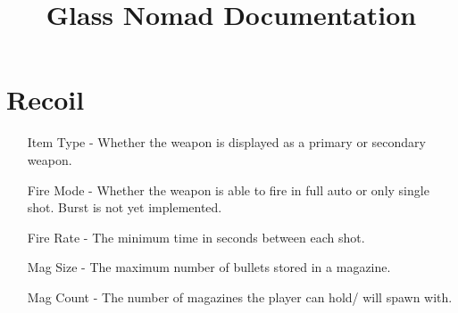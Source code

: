 \documentclass{article}
\begin{document}
    \title{Glass Nomad Documentation}


    \begin{titlepage}
        \maketitle
    \end{titlepage}

    \tableofcontents

    \newpage

    \section{Recoil}
    \begin{itemize}
        \item[Item Type - ] Whether the weapon is displayed as a primary or secondary weapon.
        \item[Fire Mode - ] Whether the weapon is able to fire in full auto or only single shot. Burst is not yet implemented.
        \item[Fire Rate - ] The minimum time in seconds between each shot.
        \item[Mag Size -  ] The maximum number of bullets stored in a magazine.
        \item[Mag Count - ] The number of magazines the player can hold/ will spawn with.    
    \end{itemize}
\end{document}
